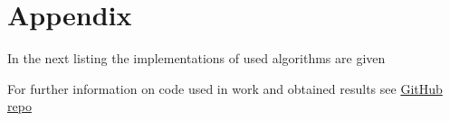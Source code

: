\section*{Appendix}

In the next listing the implementations of used algorithms are given




For further information on code used in work and obtained results see \href{https://github.com/RyazMax/ITMO_Algorithms/tree/main/LR5}{GitHub repo}